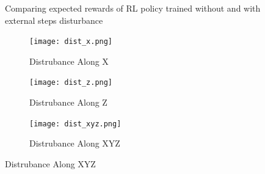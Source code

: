 \documentclass[../templateLTHtwocol.tex]{subfiles}
\begin{document}
\begin{figure}[H]
	\centering
	\caption{Robustness Evaluation - External Disturbance Injection}
	{Comparing expected rewards of RL policy trained without and with external steps disturbance}
	\begin{subfigure}[b]{0.45\textwidth}
		\caption{Distrubance Along X}
		\texttt{[image: dist\_x.png]}
		\label{dist_x:fig}
	\end{subfigure}
	\hfill
	\begin{subfigure}[b]{0.45\textwidth}
		\caption{Distrubance Along Z}
		\texttt{[image: dist\_z.png]}
		\label{dist_z:fig}
	\end{subfigure}
	\hfill
	\begin{subfigure}[b]{0.45\textwidth}
		\caption{Distrubance Along XYZ}
		\texttt{[image: dist\_xyz.png]}
		\label{dist_xyz:fig}
	\end{subfigure}
\end{figure}
\end{document}
